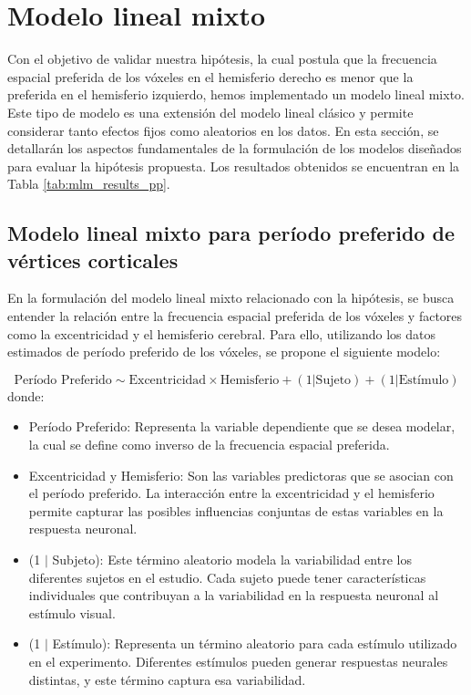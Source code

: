 \section{Modelo lineal mixto}
\label{mlm}
Con el objetivo de validar nuestra hipótesis, la cual postula que la frecuencia espacial preferida de los v\'oxeles en el hemisferio derecho es menor que la preferida en el hemisferio izquierdo, hemos implementado un modelo lineal mixto. Este tipo de modelo es una extensión del modelo lineal clásico y permite considerar tanto efectos fijos como aleatorios en los datos. En esta sección, se detallarán los aspectos fundamentales de la formulación de los modelos diseñados para evaluar la hipótesis propuesta. Los resultados obtenidos se encuentran en la Tabla \ref{tab:mlm_results_pp}.

\subsection{Modelo lineal mixto para per\'iodo preferido de v\'ertices corticales}

En la formulación del modelo lineal mixto relacionado con la hip\'otesis, se busca entender la relación entre la frecuencia espacial preferida de los vóxeles y factores como la excentricidad y el hemisferio cerebral. Para ello, utilizando los datos estimados de per\'iodo preferido de los v\'oxeles, se propone el siguiente modelo:

\begin{equation}
	\text{Período Preferido} \sim  \text{Excentricidad} \times \text{Hemisferio} + (1 | \text{Sujeto}) + (1 | \text{Estímulo})	
	\label{mlm_pp}
\end{equation}
donde:
\begin{itemize}
	\item Período Preferido: Representa la variable dependiente que se desea modelar, la cual se define como inverso de la frecuencia espacial preferida.
	
	\item Excentricidad y Hemisferio: Son las variables predictoras que se asocian con el período preferido. La interacción entre la excentricidad y el hemisferio permite capturar las posibles influencias conjuntas de estas variables en la respuesta neuronal.
	
	\item (1 $|$ Subjeto): Este término aleatorio modela la variabilidad entre los diferentes sujetos en el estudio. Cada sujeto puede tener características individuales que contribuyan a la variabilidad en la respuesta neuronal al estímulo visual.

	\item (1 $|$ Est\'imulo): Representa un término aleatorio para cada estímulo utilizado en el experimento. Diferentes estímulos pueden generar respuestas neurales distintas, y este término captura esa variabilidad.
	
\end{itemize}

